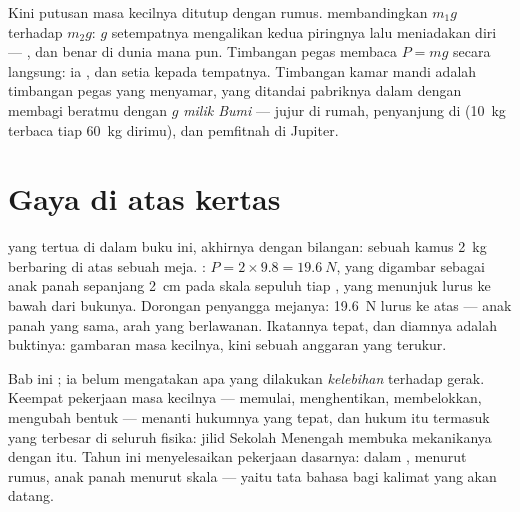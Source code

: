 \begin{remark}\label{rem:g9:weight-vs-mass:scales}
Kini putusan masa kecilnya ditutup dengan rumus. 
membandingkan $m_1 g$ terhadap $m_2 g$: $g$ setempatnya mengalikan
kedua piringnya lalu meniadakan diri ---   \emph{},
dan benar di dunia mana pun. Timbangan pegas membaca $P = m g$ secara
langsung: ia  \emph{}, dan setia kepada tempatnya.
Timbangan kamar mandi adalah timbangan pegas yang menyamar, yang
ditandai pabriknya dalam  dengan membagi beratmu dengan $g$
\emph{milik Bumi} --- jujur di rumah, penyanjung di 
(\qty{10}{kg} terbaca tiap \qty{60}{kg} dirimu), dan pemfitnah di
Jupiter.
\end{remark}

\section{Gaya di atas kertas}

\begin{example}\label{ex:g9:weight-vs-mass:book}
 yang tertua di dalam buku ini, akhirnya dengan bilangan:
sebuah kamus \qty{2}{kg} berbaring di atas sebuah meja. : $P = 2
\times 9.8 = \qty{19.6}{N}$, yang digambar sebagai anak panah sepanjang
\qty{2}{cm} pada skala sepuluh  tiap , yang menunjuk
lurus ke bawah dari bukunya. Dorongan penyangga mejanya:
\qty{19.6}{N} lurus ke atas --- anak panah yang sama, arah yang
berlawanan. Ikatannya tepat, dan diamnya adalah buktinya: gambaran masa
kecilnya, kini sebuah anggaran yang terukur.
\end{example}

\begin{remark}\label{rem:g9:weight-vs-mass:dynamics}
Bab ini  ; ia belum mengatakan apa yang dilakukan
\emph{kelebihan}  terhadap gerak. Keempat pekerjaan masa kecilnya
--- memulai, menghentikan, membelokkan, mengubah bentuk --- menanti
hukumnya yang tepat, dan hukum itu termasuk yang terbesar di seluruh
fisika: jilid Sekolah Menengah membuka mekanikanya dengan itu. Tahun
ini menyelesaikan pekerjaan dasarnya:  dalam ,  menurut
rumus, anak panah menurut skala --- yaitu tata bahasa bagi kalimat yang
akan datang.
\end{remark}


